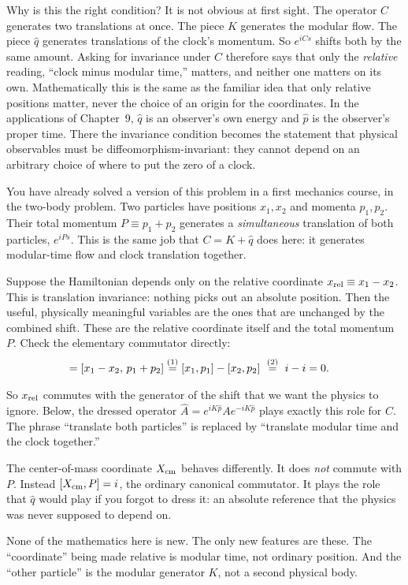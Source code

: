 Why is this the right condition? It is not obvious at first sight. The operator $C$ generates two translations
at once. The piece $K$ generates the modular flow. The piece $\hat q$ generates translations of the clock's
momentum. So $e^{iCs}$ shifts both by the same amount. Asking for invariance under $C$ therefore says that only
the \emph{relative} reading, ``clock minus modular time,'' matters, and neither one matters on its own.
Mathematically this is the same as the familiar idea that only relative positions matter, never the choice of
an origin for the coordinates. In the applications of Chapter~9, $\hat q$ is an observer's own energy and
$\hat p$ is the observer's proper time. There the invariance condition becomes the statement that physical
observables must be diffeomorphism-invariant: they cannot depend on an arbitrary choice of where to put the
zero of a clock.

\begin{physconnect}
You have already solved a version of this problem in a first mechanics course, in the two-body problem. Two
particles have positions $x_1,x_2$ and momenta $p_1,p_2$. Their total momentum $P\equiv p_1+p_2$ generates a
\emph{simultaneous} translation of both particles, $e^{iPs}$. This is the same job that $C=K+\hat q$ does here:
it generates modular-time flow and clock translation together.

Suppose the Hamiltonian depends only on the relative coordinate $x_{\rm rel}\equiv x_1-x_2$. This is
translation invariance: nothing picks out an absolute position. Then the useful, physically meaningful
variables are the ones that are unchanged by the combined shift. These are the relative coordinate itself and
the total momentum $P$. Check the elementary commutator directly:
\begin{align}
[x_{\rm rel},P] = [x_1-x_2,\,p_1+p_2]
&\eqstep{1} [x_1,p_1] - [x_2,p_2]
\ \eqstep{2}\ i - i = 0 . \notag
\end{align}
\quad
{}

So $x_{\rm rel}$ commutes with the generator of the shift that we want the physics to ignore. Below, the
dressed operator $\widehat A=e^{iK\hat p}Ae^{-iK\hat p}$ plays exactly this role for $C$. The phrase ``translate
both particles'' is replaced by ``translate modular time and the clock together.''

The center-of-mass coordinate $X_{\rm cm}$ behaves differently. It does \emph{not} commute with $P$. Instead
$[X_{\rm cm},P]=i$, the ordinary canonical commutator. It plays the role that $\hat q$ would play if you forgot
to dress it: an absolute reference that the physics was never supposed to depend on.

None of the mathematics here is new. The only new features are these. The ``coordinate'' being made relative
is modular time, not ordinary position. And the ``other particle'' is the modular generator $K$, not a second
physical body.
\end{physconnect}

